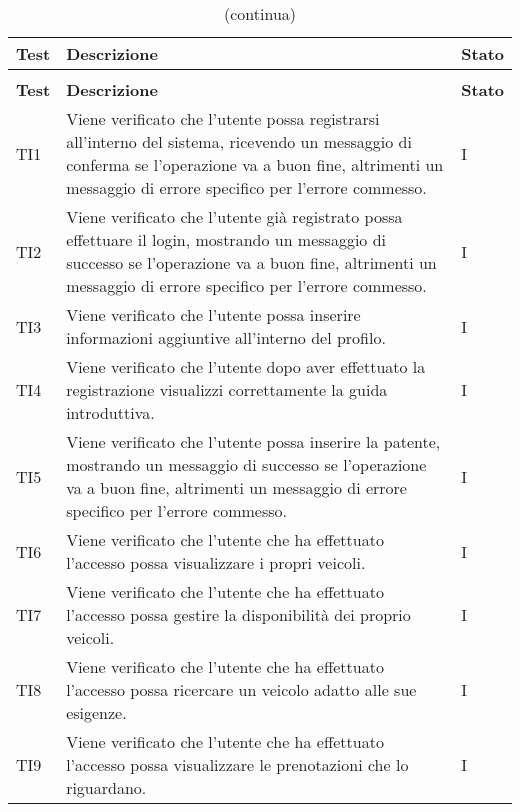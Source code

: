 \begin{longtable}{ >{\centering}p{} >{\centering}p{} >{\centering}p{}
			}%
			
		\caption{Riepilogo test di integrazione}\\	
		\rowcolorhead
		\textbf{\color{white}Test}  
		& \textbf{\color{white}Descrizione} 
		& \textbf{\color{white}Stato}
		\tabularnewline %
		\endfirsthead	
		
		\rowcolor{white}\caption[]{(continua)}\\	
		\rowcolorhead
		\textbf{\color{white}Test} 
		& \textbf{\color{white}Descrizione}
		& \textbf{\color{white}Stato} 
		\tabularnewline %
		\endhead	
TI1&Viene verificato che l'utente possa registrarsi all'interno del sistema, ricevendo un messaggio di conferma se l'operazione va a buon fine, altrimenti un messaggio di errore specifico per l'errore commesso. & I  \tabularnewline

TI2&Viene verificato che l'utente già registrato possa effettuare il login, mostrando un messaggio di successo se l'operazione va a buon fine, altrimenti un messaggio di errore specifico per l'errore commesso. & I  \tabularnewline

TI3&Viene verificato che l'utente possa inserire informazioni aggiuntive all'interno del profilo. & I  \tabularnewline 

TI4&Viene verificato che l'utente dopo aver effettuato la registrazione visualizzi correttamente la guida introduttiva. & I  \tabularnewline

TI5&Viene verificato che l'utente possa inserire la patente, mostrando un messaggio di successo se l'operazione va a buon fine, altrimenti un messaggio di errore specifico per l'errore commesso. & I  \tabularnewline

TI6&Viene verificato che l'utente che ha effettuato l'accesso possa visualizzare i propri veicoli. & I  \tabularnewline

TI7&Viene verificato che l'utente che ha effettuato l'accesso possa gestire la disponibilità dei proprio veicoli. & I \tabularnewline


TI8&Viene verificato che l'utente che ha effettuato l'accesso possa ricercare un veicolo adatto alle sue esigenze. & I \tabularnewline

TI9&Viene verificato che l'utente che ha effettuato l'accesso possa visualizzare le prenotazioni che lo riguardano. & I  \tabularnewline


\end{longtable}
